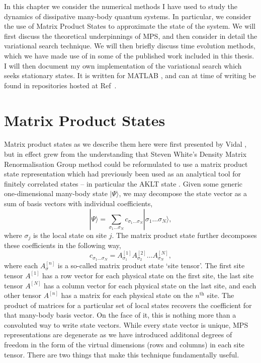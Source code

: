 In this chapter we consider the numerical methods I have used to study the dynamics of dissipative many-body quantum systems. In particular, we consider the use of Matrix Product States to approximate the state of the system. We will first discuss the theoretical underpinnings of MPS, and then consider in detail the variational search technique. We will then briefly discuss time evolution methods, which we have made use of in some of the published work included in this thesis. I will then document my own implementation of the variational search which seeks stationary states. It is written for MATLAB \cite{MATLAB}, and can at time of writing be found in repositories hosted at Ref~\cite{otb:githome}.

 \section{Matrix Product States}
 Matrix product states as we describe them here were first presented by Vidal \cite{Vidal2004}, but in effect grew from the understanding that Steven White's Density Matrix Renormalisation Group method \cite{White1992,White1993} could be reformulated to use a matrix product state representation which had previously been used as an analytical tool for finitely correlated states -- in particular the AKLT state \cite{Affleck1987}.
 Given some generic one-dimensional many-body state \(|\Psi \rangle\), we may decompose the state vector as a sum of basis vectors with individual coefficients,
 \begin{equation}
 	|\Psi \rangle = \sum_{\sigma_{1} \ldots \sigma_{N}} c_{\sigma_{1} \ldots \sigma_{N}}| \sigma_{1} \ldots \sigma_{N} \rangle,
 	\label{eq:mps1-1}
 \end{equation}
 where \(\sigma_{j}\) is the local state on site \(j\). The matrix product state further decomposes these coefficients in the following way,
 \begin{equation}
 	c_{\sigma_{1} \ldots \sigma_{N}} = A^{[1]}_{\sigma_{1}} A^{[2]}_{\sigma_{2}} \ldots A^{[N]}_{\sigma_{N}},
 	\label{eq:mps1-2}
 \end{equation}
 where each \(A^{[n]}_{\sigma}\) is a so-called matrix product state `site tensor'. The first site tensor \(A^{[1]}\) has a row vector for each physical state on the first site, the last site tensor \(A^{[N]}\) has a column vector for each physical state on the last site, and each other tensor \(A^{[n]}\) has a matrix for each physical state on the \(n^{\mathrm{th}}\) site. The product of matrices for a particular set of local states recovers the coefficient for that many-body basis vector. On the face of it, this is nothing more than a convoluted way to write state vectors. While every state vector is unique, MPS representations are degenerate as we have introduced additonal degrees of freedom in the form of the virtual dimensions (rows and columns) in each site tensor. There are two things that make this technique fundamentally useful.

